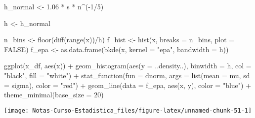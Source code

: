 \documentclass[
  12pt,
]{book}
\newenvironment{Shaded}{\begin{snugshade}}{\end{snugshade}}
\newcommand{\AttributeTok}[1]{\textcolor[rgb]{0.77,0.63,0.00}{#1}}
\newcommand{\ConstantTok}[1]{\textcolor[rgb]{0.00,0.00,0.00}{#1}}
\newcommand{\DecValTok}[1]{\textcolor[rgb]{0.00,0.00,0.81}{#1}}
\newcommand{\FloatTok}[1]{\textcolor[rgb]{0.00,0.00,0.81}{#1}}
\newcommand{\FunctionTok}[1]{\textcolor[rgb]{0.00,0.00,0.00}{#1}}
\newcommand{\NormalTok}[1]{#1}
\newcommand{\OtherTok}[1]{\textcolor[rgb]{0.56,0.35,0.01}{#1}}
\newcommand{\SpecialCharTok}[1]{\textcolor[rgb]{0.00,0.00,0.00}{#1}}
\newcommand{\StringTok}[1]{\textcolor[rgb]{0.31,0.60,0.02}{#1}}
\theoremstyle{definition}
\theoremstyle{definition}
\theoremstyle{definition}
\theoremstyle{definition}
\theoremstyle{remark}
\begin{document}
\begin{Shaded}
\begin{Highlighting}[]
\NormalTok{h\_normal }\OtherTok{\textless{}{-}} \FloatTok{1.06} \SpecialCharTok{*}\NormalTok{ s }\SpecialCharTok{*}\NormalTok{ n}\SpecialCharTok{\^{}}\NormalTok{(}\SpecialCharTok{{-}}\DecValTok{1}\SpecialCharTok{/}\DecValTok{5}\NormalTok{)}

\NormalTok{h }\OtherTok{\textless{}{-}}\NormalTok{ h\_normal}

\NormalTok{n\_bins }\OtherTok{\textless{}{-}} \FunctionTok{floor}\NormalTok{(}\FunctionTok{diff}\NormalTok{(}\FunctionTok{range}\NormalTok{(x))}\SpecialCharTok{/}\NormalTok{h)}
\NormalTok{f\_hist }\OtherTok{\textless{}{-}} \FunctionTok{hist}\NormalTok{(x, }\AttributeTok{breaks =}\NormalTok{ n\_bins, }\AttributeTok{plot =} \ConstantTok{FALSE}\NormalTok{)}
\NormalTok{f\_epa }\OtherTok{\textless{}{-}} \FunctionTok{as.data.frame}\NormalTok{(}\FunctionTok{bkde}\NormalTok{(x, }\AttributeTok{kernel =} \StringTok{"epa"}\NormalTok{, }\AttributeTok{bandwidth =}\NormalTok{ h))}

\FunctionTok{ggplot}\NormalTok{(x\_df, }\FunctionTok{aes}\NormalTok{(x)) }\SpecialCharTok{+} \FunctionTok{geom\_histogram}\NormalTok{(}\FunctionTok{aes}\NormalTok{(}\AttributeTok{y =}\NormalTok{ ..density..),}
    \AttributeTok{binwidth =}\NormalTok{ h, }\AttributeTok{col =} \StringTok{"black"}\NormalTok{, }\AttributeTok{fill =} \StringTok{"white"}\NormalTok{) }\SpecialCharTok{+}
    \FunctionTok{stat\_function}\NormalTok{(}\AttributeTok{fun =}\NormalTok{ dnorm, }\AttributeTok{args =} \FunctionTok{list}\NormalTok{(}\AttributeTok{mean =}\NormalTok{ mu,}
        \AttributeTok{sd =}\NormalTok{ sigma), }\AttributeTok{color =} \StringTok{"red"}\NormalTok{) }\SpecialCharTok{+} \FunctionTok{geom\_line}\NormalTok{(}\AttributeTok{data =}\NormalTok{ f\_epa,}
    \FunctionTok{aes}\NormalTok{(x, y), }\AttributeTok{color =} \StringTok{"blue"}\NormalTok{) }\SpecialCharTok{+} \FunctionTok{theme\_minimal}\NormalTok{(}\AttributeTok{base\_size =} \DecValTok{20}\NormalTok{)}
\end{Highlighting}
\end{Shaded}

\begin{center}\texttt{[image: Notas-Curso-Estadistica\_files/figure-latex/unnamed-chunk-51-1]} \end{center}
\end{document}
